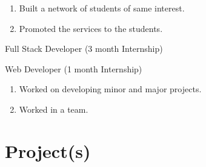 \documentclass[]{deedy-resume-openfont}
\begin{document}
\begin{minipage}[t]{0.55\textwidth}



\begin{enumerate}
\item Built a network of students of same interest.
\item Promoted the services to the students.
\end{enumerate}
\sectionsep


\descript{}
\begin{tightemize}
\item Full Stack Developer (3 month Internship)
\end{tightemize}
\hspace{\topsep}

\begin{tightemize}
\item Web Developer (1 month Internship)
\end{tightemize}
\hspace{\topsep}
\begin{enumerate}
\item Worked on developing minor and major projects.
\item Worked in a team.
\end{enumerate}


\section{Project(s)}

\end{minipage}
\end{document}

